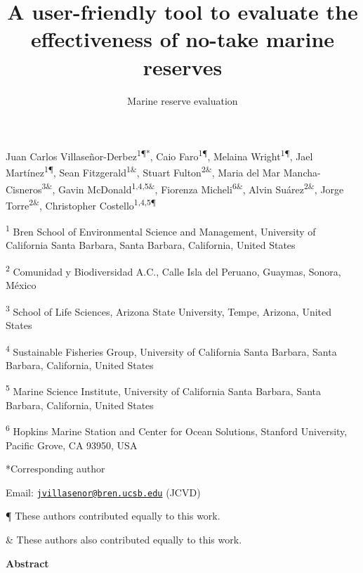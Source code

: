 \documentclass[12pt,]{article}
\title{A user-friendly tool to evaluate the effectiveness of no-take marine
reserves}
\subtitle{Marine reserve evaluation}
\author{}
\date{}
\begin{document}
\maketitle

Juan Carlos Villaseñor-Derbez\textsuperscript{1¶*}, Caio
Faro\textsuperscript{1¶}, Melaina Wright\textsuperscript{1¶}, Jael
Martínez\textsuperscript{1¶}, Sean Fitzgerald\textsuperscript{1\&},
Stuart Fulton\textsuperscript{2\&}, Maria del Mar
Mancha-Cisneros\textsuperscript{3\&}, Gavin
McDonald\textsuperscript{1,4,5\&}, Fiorenza
Micheli\textsuperscript{6\&}, Alvin Suárez\textsuperscript{2\&}, Jorge
Torre\textsuperscript{2\&}, Christopher Costello\textsuperscript{1,4,5¶}

\textsuperscript{1} Bren School of Environmental Science and Management,
University of California Santa Barbara, Santa Barbara, California,
United States

\textsuperscript{2} Comunidad y Biodiversidad A.C., Calle Isla del
Peruano, Guaymas, Sonora, México

\textsuperscript{3} School of Life Sciences, Arizona State University,
Tempe, Arizona, United States

\textsuperscript{4} Sustainable Fisheries Group, University of
California Santa Barbara, Santa Barbara, California, United States

\textsuperscript{5} Marine Science Institute, University of California
Santa Barbara, Santa Barbara, California, United States

\textsuperscript{6} Hopkins Marine Station and Center for Ocean
Solutions, Stanford University, Pacific Grove, CA 93950, USA

*Corresponding author

Email:
\href{mailto:jvillasenor@bren.ucsb.edu}{\nolinkurl{jvillasenor@bren.ucsb.edu}}
(JCVD)

¶ These authors contributed equally to this work.

\& These authors also contributed equally to this work.

\clearpage

\textbf{Abstract}
\end{document}
